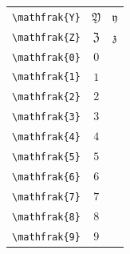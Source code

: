 \documentclass[12pt,a4paper]{article}
\begin{document}
\begin{longtable}{|c|c|c|}
\verb|\mathfrak{Y}| & $\mathfrak{Y}$ & $\mathfrak{y}$ \\ %
\verb|\mathfrak{Z}| & $\mathfrak{Z}$ & $\mathfrak{z}$ \\ %
\verb|\mathfrak{0}| & $\mathfrak{0}$ & \\ %
\verb|\mathfrak{1}| & $\mathfrak{1}$ & \\ %
\verb|\mathfrak{2}| & $\mathfrak{2}$ & \\ %
\verb|\mathfrak{3}| & $\mathfrak{3}$ & \\ %
\verb|\mathfrak{4}| & $\mathfrak{4}$ & \\ %
\verb|\mathfrak{5}| & $\mathfrak{5}$ & \\ %
\verb|\mathfrak{6}| & $\mathfrak{6}$ & \\ %
\verb|\mathfrak{7}| & $\mathfrak{7}$ & \\ %
\verb|\mathfrak{8}| & $\mathfrak{8}$ & \\ %
\verb|\mathfrak{9}| & $\mathfrak{9}$ & \\ %
\hline
\end{longtable}
\end{document}
